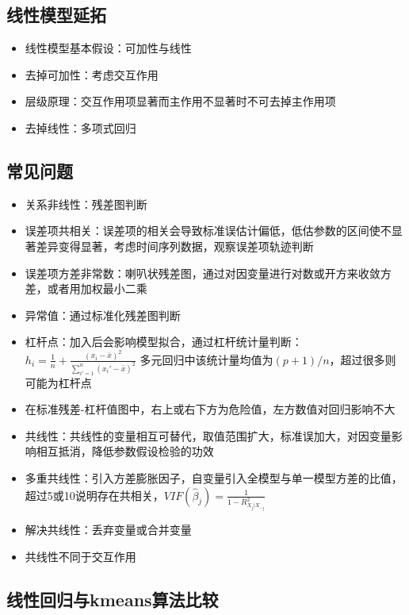 \documentclass[
]{book}
\providecommand{\tightlist}{%
  \setlength{\itemsep}{0pt}\setlength{\parskip}{0pt}}
\begin{document}
\hypertarget{ux7ebfux6027ux6a21ux578bux5ef6ux62d3}{%
\subsection{线性模型延拓}\label{ux7ebfux6027ux6a21ux578bux5ef6ux62d3}}

\begin{itemize}
\tightlist
\item
  线性模型基本假设：可加性与线性
\item
  去掉可加性：考虑交互作用
\item
  层级原理：交互作用项显著而主作用不显著时不可去掉主作用项
\item
  去掉线性：多项式回归
\end{itemize}

\hypertarget{ux5e38ux89c1ux95eeux9898}{%
\subsection{常见问题}\label{ux5e38ux89c1ux95eeux9898}}

\begin{itemize}
\tightlist
\item
  关系非线性：残差图判断
\item
  误差项共相关：误差项的相关会导致标准误估计偏低，低估参数的区间使不显著差异变得显著，考虑时间序列数据，观察误差项轨迹判断
\item
  误差项方差非常数：喇叭状残差图，通过对因变量进行对数或开方来收敛方差，或者用加权最小二乘
\item
  异常值：通过标准化残差图判断
\item
  杠杆点：加入后会影响模型拟合，通过杠杆统计量判断： \(h_i = \frac{1}{n} + \frac{(x_i - \bar x)^2}{\sum_{i' = 1}^{n} (x_i' - \bar x)^2}\) 多元回归中该统计量均值为\((p+1)/n\)，超过很多则可能为杠杆点
\item
  在标准残差-杠杆值图中，右上或右下方为危险值，左方数值对回归影响不大
\item
  共线性：共线性的变量相互可替代，取值范围扩大，标准误加大，对因变量影响相互抵消，降低参数假设检验的功效
\item
  多重共线性：引入方差膨胀因子，自变量引入全模型与单一模型方差的比值，超过5或10说明存在共相关，\(VIF(\hat \beta_j) = \frac{1}{1 - R^2_{X_j|X_{-j}}}\)
\item
  解决共线性：丢弃变量或合并变量
\item
  共线性不同于交互作用
\end{itemize}

\hypertarget{ux7ebfux6027ux56deux5f52ux4e0ekmeansux7b97ux6cd5ux6bd4ux8f83}{%
\subsection{线性回归与kmeans算法比较}\label{ux7ebfux6027ux56deux5f52ux4e0ekmeansux7b97ux6cd5ux6bd4ux8f83}}
\end{document}
